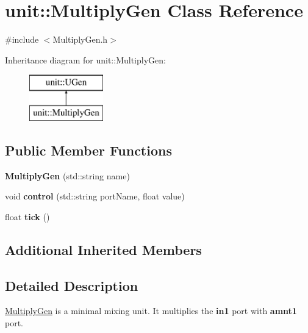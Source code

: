 \hypertarget{classunit_1_1MultiplyGen}{\section{unit\-:\-:Multiply\-Gen Class Reference}
\label{classunit_1_1MultiplyGen}
}


{\ttfamily \#include $<$Multiply\-Gen.\-h$>$}

Inheritance diagram for unit\-:\-:Multiply\-Gen\-:\begin{figure}[H]
\begin{center}
\leavevmode
\includegraphics[height=2.000000cm]{classunit_1_1MultiplyGen}
\end{center}
\end{figure}
\subsection*{Public Member Functions}
\begin{DoxyCompactItemize}
\item 
\hypertarget{classunit_1_1MultiplyGen_a8c63aba9e9be634e03f900182b4a1d7a}{{\bfseries Multiply\-Gen} (std\-::string name)}\label{classunit_1_1MultiplyGen_a8c63aba9e9be634e03f900182b4a1d7a}

\item 
\hypertarget{classunit_1_1MultiplyGen_a399981309ef24f24c7044172e58c1e8a}{void {\bfseries control} (std\-::string port\-Name, float value)}\label{classunit_1_1MultiplyGen_a399981309ef24f24c7044172e58c1e8a}

\item 
\hypertarget{classunit_1_1MultiplyGen_abeeb8a84f91375454120639a9bb810fb}{float {\bfseries tick} ()}\label{classunit_1_1MultiplyGen_abeeb8a84f91375454120639a9bb810fb}

\end{DoxyCompactItemize}
\subsection*{Additional Inherited Members}


\subsection{Detailed Description}
\hyperlink{classunit_1_1MultiplyGen}{Multiply\-Gen} is a minimal mixing unit. It multiplies the {\bfseries in1} port with {\bfseries amnt1} port.


